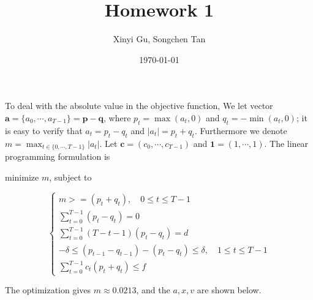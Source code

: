 \documentclass{article}
\title{Homework 1}
\author{Xinyi Gu, Songchen Tan}
\date{\today}
\renewcommand{\a}{\bm a}
\renewcommand{\c}{\bm c}
\newcommand{\p}{\bm p}
\newcommand{\q}{\bm q}
\newcommand{\1}{\bm 1}
\begin{document}
\maketitle
\section{}
\subsection{}

To deal with the absolute value in the objective function, We let vector $\a=\{a_0,\cdots,a_{T-1}\}=\p-\q$, where $p_t=\max(a_t,0)$ and $q_t=-\min(a_t,0)$; it is easy to verify that $a_t=p_t-q_t$ and $|a_t|=p_t+q_t$. Furthermore we denote $m=\max_{t\in\{0,\cdots,T-1\}}|a_t|$. Let $\c=(c_0,\cdots,c_{T-1})$ and $\1=(1,\cdots,1)$. The linear programming formulation is

minimize $m$, subject to

$$
\begin{cases}
    m >= (p_t + q_t), \quad 0\le t\le T-1\\
    \displaystyle
    \sum_{t=0}^{T-1}(p_t - q_t)=0\\
    \displaystyle
    \sum_{t=0}^{T-1}(T-t-1)(p_t - q_t)=d\\
    -\delta \le (p_{t-1} - q_{t-1})-(p_t - q_t) \le\delta, \quad 1\le t\le T-1\\
    \displaystyle
    \sum_{t=0}^{T-1}c_t(p_t+q_t)\le f
\end{cases}
$$

The optimization gives $m\approx 0.0213$, and the $a, x, v$ are shown below.
\end{document}
